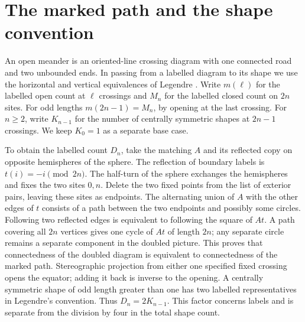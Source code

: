

\begin{abstract}
Let \(K_k\) be the number of centrally symmetric open meander shapes with \(2k+1\) crossings in the convention of Legendre. We compute \(K_k\) through \(k=45\), recovering all entries through \(k=32\) in the public data of Hogan. We keep the boundary path attached to one marked end and join each pair of endpoints as soon as every completion requires it. For a fixed deficit \(j\) of the crossing height we give a cyclotomic denominator and prove that the resulting count is eventually a quasipolynomial of degree \(2j\). Its period divides \(\operatorname{lcm}(1,3,\ldots,2j+1)\). Legendre's orbit formula then gives the total number of open shapes at every odd crossing count through 75.
\end{abstract}

\section{The marked path and the shape convention}
An open meander is an oriented-line crossing diagram with one connected road and two unbounded ends. In passing from a labelled diagram to its shape we use the horizontal and vertical equivalences of Legendre \cite[Prop.~6.1]{legendre}. Write \(m(\ell)\) for the labelled open count at \(\ell\) crossings and \(M_n\) for the labelled closed count on \(2n\) sites. For odd lengths \(m(2n-1)=M_n\), by opening at the last crossing. For \(n\ge2\), write \(K_{n-1}\) for the number of centrally symmetric shapes at \(2n-1\) crossings. We keep \(K_0=1\) as a separate base case.

To obtain the labelled count \(D_n\), take the matching \(A\) and its reflected copy on opposite hemispheres of the sphere. The reflection of boundary labels is \(t(i)=-i\pmod{2n}\). The half-turn of the sphere exchanges the hemispheres and fixes the two sites \(0,n\). Delete the two fixed points from the list of exterior pairs, leaving these sites as endpoints. The alternating union of \(A\) with the other edges of \(t\) consists of a path between the two endpoints and possibly some circles. Following two reflected edges is equivalent to following the square of \(At\). A path covering all \(2n\) vertices gives one cycle of \(At\) of length \(2n\); any separate circle remains a separate component in the doubled picture. This proves that connectedness of the doubled diagram is equivalent to connectedness of the marked path. Stereographic projection from either one specified fixed crossing opens the equator; adding it back is inverse to the opening. A centrally symmetric shape of odd length greater than one has two labelled representatives in Legendre's convention. Thus \(D_n=2K_{n-1}\). This factor concerns labels and is separate from the division by four in the total shape count.

